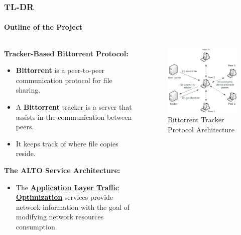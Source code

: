 \documentclass[10pt,    %
    english,            %
    xcolor=table,       %
    envcountsect,        %
    aspectratio=169     %
]{beamer}
\begin{document}
\begin{frame}
    \frametitle{TL-DR}
    \framesubtitle{Outline of the Project}

    \begin{columns}
        \begin{column}{.55\textwidth}
            \textbf{Tracker-Based Bittorrent Protocol:}
            \begin{itemize}
                \item \textbf{Bittorrent} is a peer-to-peer communication protocol for file sharing.
                \item A \textbf{Bittorrent} tracker is a server that assists in the communication between peers.
                \item It keeps track of where file copies reside.
            \end{itemize}
            \textbf{The ALTO Service Architecture:}
            \begin{itemize}
                \item The \textbf{\href{https://tools.ietf.org/html/rfc7285}{Application Layer Traffic Optimization}} services provide network information with the goal of modifying network resources consumption.
            \end{itemize}
        \end{column}
        \hfill
        \begin{column}{.35\textwidth}
            \begin{figure}[h!]
                \centering
                \includegraphics[width=\textwidth]{./images/bit-torrent.png}
                \caption{Bittorrent Tracker Protocol Architecture}
            \end{figure}
        \end{column}
    \end{columns}

\end{frame}
\end{document}
